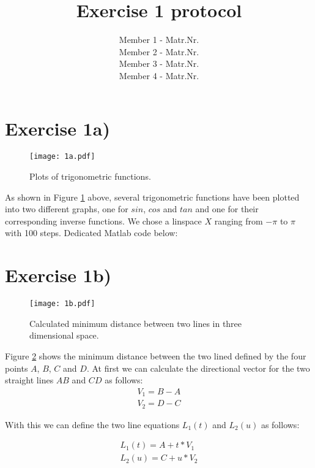 \documentclass[10pt,a4paper]{article}
\title{Exercise 1 protocol}
\author{Member 1 - Matr.Nr. \\
Member 2 - Matr.Nr. \\
Member 3 - Matr.Nr. \\
Member 4 - Matr.Nr.}
\begin{document}
	\maketitle
	\section*{Exercise 1a)}
	
	\begin{figure}[H]
		\texttt{[image: 1a.pdf]}
		\caption{Plots of trigonometric functions.}
		\label{fig:1a}
	\end{figure}
	
	As shown in Figure \ref{fig:1a} above, several trigonometric functions have been plotted into two different graphs, one for $sin$, $cos$ and $tan$ and one for their corresponding inverse functions. We chose a linspace $X$ ranging from $-\pi$ to $\pi$ with 100 steps.\newline
	Dedicated Matlab code below:
	
	
	
	\section*{Exercise 1b)}
	
	\begin{figure}[H]
		\texttt{[image: 1b.pdf]}
		\caption{Calculated minimum distance between two lines in three dimensional space.}
		\label{fig:1b}
	\end{figure}
	
	Figure \ref{fig:1b} shows the minimum distance between the two lined defined by the four points $A$, $B$, $C$ and $D$.\newline
	At first we can calculate the directional vector for the two straight lines $AB$ and $CD$ as follows:
	\begin{equation}
		\begin{aligned}
			V_1 = B-A \\
			V_2 = D -C
		\end{aligned}
	\end{equation}
	
	With this we can define the two line equations $L_1(t)$ and $L_2(u)$ as follows:
	
	\begin{equation}
		\begin{aligned}
			L_1(t) = A +t*V_1 \\
			L_2(u) = C +u*V_2
		\end{aligned}
	\end{equation}
	
\end{document}
